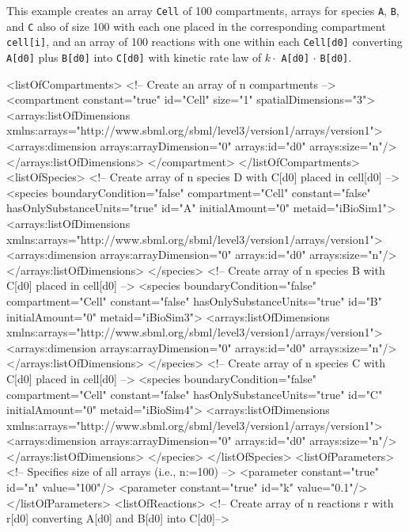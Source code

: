 This example creates an array {\tt Cell} of 100 compartments, arrays for species {\tt A}, {\tt B}, and {\tt C} also of size 100 with each one placed in the corresponding compartment {\tt cell[i]}, and an array of 100 reactions with one within each {\tt Cell[d0]} converting {\tt A[d0]} plus {\tt B[d0]} into {\tt C[d0]} with kinetic rate law of $k \cdot$ {\tt A[d0]} $\cdot$ {\tt B[d0]}.

\begin{example}
<listOfCompartments>
<!-- Create an array of n compartments -->
      <compartment constant="true" id="Cell" size="1" spatialDimensions="3">
        <arrays:listOfDimensions xmlns:arrays="http://www.sbml.org/sbml/level3/version1/arrays/version1">
          <arrays:dimension arrays:arrayDimension="0" arrays:id="d0" arrays:size="n"/>
        </arrays:listOfDimensions>
      </compartment>
    </listOfCompartments>
    <listOfSpecies>
 <!-- Create array of n species D with C[d0] placed in cell[d0] -->
      <species boundaryCondition="false" compartment="Cell" constant="false" hasOnlySubstanceUnits="true" id="A" initialAmount="0" metaid="iBioSim1">
        <arrays:listOfDimensions xmlns:arrays="http://www.sbml.org/sbml/level3/version1/arrays/version1">
          <arrays:dimension arrays:arrayDimension="0" arrays:id="d0" arrays:size="n"/>
        </arrays:listOfDimensions>
      </species>
 <!-- Create array of n species B with C[d0] placed in cell[d0] -->
      <species boundaryCondition="false" compartment="Cell" constant="false" hasOnlySubstanceUnits="true" id="B" initialAmount="0" metaid="iBioSim3">
        <arrays:listOfDimensions xmlns:arrays="http://www.sbml.org/sbml/level3/version1/arrays/version1">
          <arrays:dimension arrays:arrayDimension="0" arrays:id="d0" arrays:size="n"/>
        </arrays:listOfDimensions>
      </species>
 <!-- Create array of n species C with C[d0] placed in cell[d0] -->
      <species boundaryCondition="false" compartment="Cell" constant="false" hasOnlySubstanceUnits="true" id="C" initialAmount="0" metaid="iBioSim4">
        <arrays:listOfDimensions xmlns:arrays="http://www.sbml.org/sbml/level3/version1/arrays/version1">
          <arrays:dimension arrays:arrayDimension="0" arrays:id="d0" arrays:size="n"/>
        </arrays:listOfDimensions>
      </species>
    </listOfSpecies>
    <listOfParameters>
    <!-- Specifies size of all arrays (i.e., n:=100) -->
      <parameter constant="true" id="n" value="100"/>
      <parameter constant="true" id="k" value="0.1"/>
    </listOfParameters>
    <listOfReactions>
      <!-- Create array of n reactions r with r[d0] converting A[d0] and B[d0] into C[d0]-->

\end{example}
